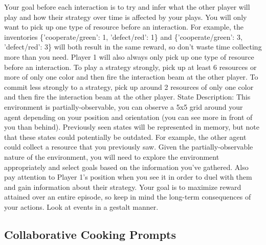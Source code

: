 \documentclass{article} %
\begin{document}
\begin{tcolorbox}
Your goal before each interaction is to try and infer what the other player will play and how their strategy over time is affected by your plays.
You will only want to pick up one type of resource before an interaction.
For example, the inventories \{'cooperate/green': 1, 'defect/red': 1\} and \{'cooperate/green': 3, 'defect/red': 3\} will both result in the same reward, so don't waste time collecting more than you need.
Player 1 will also always only pick up one type of resource before an interaction.
To play a strategy strongly, pick up at least 6 resources or more of only one color and then fire the interaction beam at the other player.
To commit less strongly to a strategy, pick up around 2 resources of only one color and then fire the interaction beam at the other player.
State Description: This environment is partially-observable, you can observe a 5x5 grid around your agent depending on your position and orientation (you can see more in front of you than behind).
Previously seen states will be represented in memory, but note that these states could potentially be outdated. For example, the other agent could collect a resource that you previously saw.
Given the partially-observable nature of the environment, you will need to explore the environment appropriately and select goals based on the information you've gathered.
Also pay attention to Player 1's position when you see it in order to duel with them and gain information about their strategy.
Your goal is to maximize reward attained over an entire episode, so keep in mind the long-term consequences of your actions. Look at events in a gestalt manner.
\end{tcolorbox}
\vspace{-10pt} 

\subsection{Collaborative Cooking Prompts}
\end{document}
